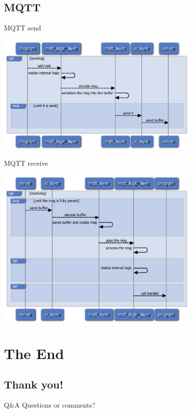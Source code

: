 \documentclass{beamer}
\begin{document}
\subsection{MQTT}

\begin{frame}{MQTT send}
    \centerline{\includegraphics[width=0.75\textwidth]{design-intro.slides/mqtt_send.pdf}}
\end{frame}

\begin{frame}{MQTT receive}
    \centerline{\includegraphics[width=0.75\textwidth]{design-intro.slides/mqtt_recv.pdf}}
\end{frame}

\section{The End}

\subsection{Thank you!}

\begin{frame}{Q\&A}
Questions or comments?
\end{frame}
\end{document}
